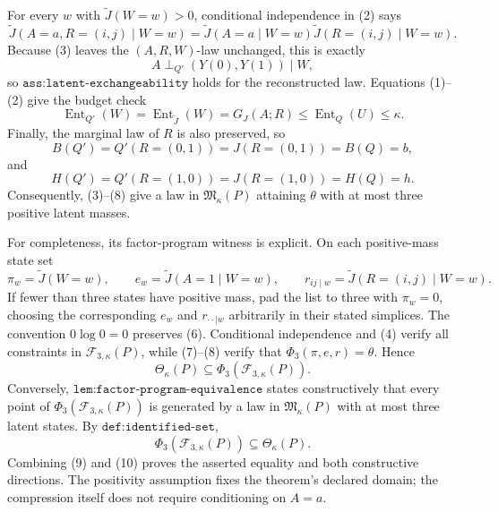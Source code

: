 For every \(w\) with \(\widetilde J(W=w)>0\), conditional independence in (2) says
\[
\widetilde J(A=a,R=(i,j)\mid W=w)
=\widetilde J(A=a\mid W=w)
 \widetilde J(R=(i,j)\mid W=w).
\]
Because (3) leaves the \((A,R,W)\)-law unchanged, this is exactly
\[
A\perp_{Q'}(Y(0),Y(1))\mid W, \tag{5}
\]
so \(\texttt{ass:latent-exchangeability}\) holds for the reconstructed law.  Equations (1)--(2) give the budget check
\[
\operatorname{Ent}_{Q'}(W)
=\operatorname{Ent}_{\widetilde J}(W)
=G_J(A;R)
\leq\operatorname{Ent}_Q(U)
\leq\kappa. \tag{6}
\]
Finally, the marginal law of \(R\) is also preserved, so
\[
B(Q')=Q'(R=(0,1))=J(R=(0,1))=B(Q)=b, \tag{7}
\]
and
\[
H(Q')=Q'(R=(1,0))=J(R=(1,0))=H(Q)=h. \tag{8}
\]
Consequently, (3)--(8) give a law in \(\mathfrak M_\kappa(P)\) attaining \(\theta\) with at most three positive latent masses.

For completeness, its factor-program witness is explicit.  On each positive-mass state set
\[
\pi_w=\widetilde J(W=w),\qquad
e_w=\widetilde J(A=1\mid W=w),\qquad
r_{ij\mid w}=\widetilde J(R=(i,j)\mid W=w).
\]
If fewer than three states have positive mass, pad the list to three with \(\pi_w=0\), choosing the corresponding \(e_w\) and \(r_{\cdot\cdot\mid w}\) arbitrarily in their stated simplices.  The convention \(0\log0=0\) preserves (6).  Conditional independence and (4) verify all constraints in \(\mathcal F_{3,\kappa}(P)\), while (7)--(8) verify that \(\Phi_3(\pi,e,r)=\theta\).  Hence
\[
\Theta_\kappa(P)\subseteq\Phi_3(\mathcal F_{3,\kappa}(P)). \tag{9}
\]
Conversely, \(\texttt{lem:factor-program-equivalence}\) states constructively that every point of \(\Phi_3(\mathcal F_{3,\kappa}(P))\) is generated by a law in \(\mathfrak M_\kappa(P)\) with at most three latent states.  By \(\texttt{def:identified-set}\),
\[
\Phi_3(\mathcal F_{3,\kappa}(P))\subseteq\Theta_\kappa(P). \tag{10}
\]
Combining (9) and (10) proves the asserted equality and both constructive directions.  The positivity assumption fixes the theorem's declared domain; the compression itself does not require conditioning on \(A=a\).